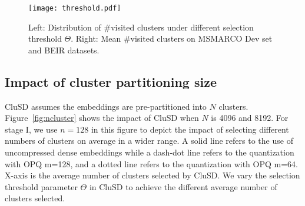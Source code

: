 \begin{figure}[h!]
    \centering
    \texttt{[image: threshold.pdf]}
    \caption{Left: Distribution  of \#visited clusters under different selection threshold $\Theta$.
Right: Mean \#visited clusters on MSMARCO Dev set and BEIR datasets.}
     \vspace*{-5mm}
    \label{fig:thresholds}
\end{figure}

\subsection{Impact of  cluster partitioning size}
\label{sect:clusterno}

CluSD assumes the embeddings are pre-partitioned into $N$ clusters.  Figure~\ref{fig:ncluster} shows the impact of CluSD when
$N$ is  4096 and  8192.
For stage I, we use $n=128$ in this figure to depict the impact of selecting different numbers of clusters on average in a wider range.
A  solid line refers to the use of uncompressed dense embeddings while  a dash-dot line refers to the quantization with OPQ m=128, 
and a dotted line refers to the quantization  with OPQ m=64. X-axis is the average number of clusters selected by CluSD.
We vary the selection threshold parameter $\Theta$ in CluSD to achieve the different average number of clusters selected. 


